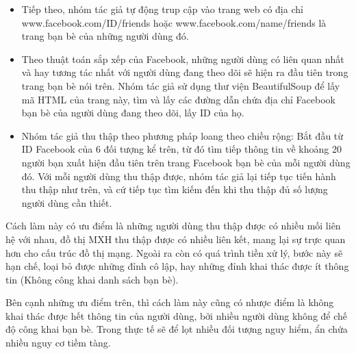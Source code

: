 \begin {itemize}
\begin {enumerate} [+]
				\item https://www.facebook.com/jbnguyenhuuvinh: Anh Ba Sàm, tên thật là Nguyễn Hữu Vinh là một blogger, từng là công an và đảng viên Đảng Cộng sản Việt Nam, từng công tác ở Ủy ban Việt kiều Trung ương. Ông bị Chính phủ CHXHCN Việt Nam bắt giữ và bị cáo buộc và phạt tù 5 năm do có hành vi đăng tải các bài viết trên mạng Internet vi phạm Điều 258 Bộ Luật Hình sự năm 2015 sửa đổi bổ sung năm 2017 về Tội lợi dụng các quyền tự do dân chủ xâm phạm lợi ích của Nhà nước, quyền, lợi ích hợp pháp của tổ chức, công dân.
		
				\item https://www.facebook.com/profile.php?id=100015485029386: Nguyễn Trọng đang sinh sống tại California, Hoa Kỳ. Lợi dụng quyền tự do dân chủ, thường xuyên có những bài viết xuyên tạc, chống phá đường lối chính sác của Đảng, pháp luật của Nhà nước.
				\end {enumerate}
			\item Tiếp theo, nhóm tác giả tự động trup cập vào trang web có địa chỉ www.facebook.com/{ID}/friends hoặc www.facebook.com/{name}/friends là trang bạn bè của những người dùng đó.
		
			\item Theo thuật toán sắp xếp của Facebook, những người dùng có liên quan nhất và hay tương tác nhất với người dùng đang theo dõi sẽ hiện ra đầu tiên trong trang bạn bè nói trên. Nhóm tác giả sử dụng thư viện BeautifulSoup để lấy mã HTML của trang này, tìm và lấy các đường dẫn chứa địa chỉ Facebook bạn bè của người dùng đang theo dõi, lấy ID của họ.
		
			\item Nhóm tác giả thu thập theo phương pháp loang theo chiều rộng: Bắt đầu từ ID Facebook của 6 đối tượng kể trên, từ đó tìm tiếp thông tin về khoảng 20 người bạn xuất hiện đầu tiên trên trang Facebook bạn bè của mỗi người dùng đó. Với mỗi người dùng thu thập được, nhóm tác giả lại tiếp tục tiến hành thu thập như trên, và cứ tiếp tục tìm kiếm đến khi thu thập đủ số lượng người dùng cần thiết.
		\end {itemize}		
		Cách làm này có ưu điểm là những người dùng thu thập được có nhiều mối liên hệ với nhau, đồ thị MXH thu thập được có nhiều liên kết, mang lại sự trực quan hơn cho cấu trúc đồ thị mạng. Ngoài ra còn có quá trình tiền xử lý, bước này sẽ hạn chế, loại bỏ được những đỉnh cô lập, hay những đỉnh khai thác được ít thông tin (Không công khai danh sách bạn bè).
		
		Bên cạnh những ưu điểm trên, thì cách làm này cũng có nhược điểm là không khai thác được hết thông tin của người dùng, bởi nhiều người dùng không để chế độ công khai bạn bè. Trong thực tế sẽ để lọt nhiều đối tượng nguy hiểm, ẩn chứa nhiều nguy cơ tiềm tàng.
		
